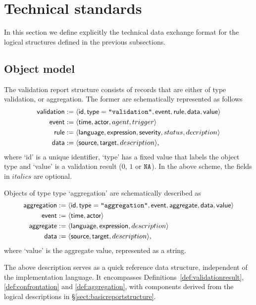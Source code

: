 \section{Technical standards}
\label{sect:standards}
In this section we define explicitly the technical data exchange format for the
logical structures defined in the previous subsections.

\subsection{Object model}
The validation report structure consists of records that are either of
type validation, or aggregation. The former are schematically represented as
follows
\begin{align*}
\textsf{validation}&:=\langle
  \textsf{id}
, \textsf{type}=\texttt{"validation"}
, \textsf{event}
, \textsf{rule}
,\textsf{data}
,\textsf{value}\rangle\\
\textsf{event} &:= \langle
  \textsf{time}
, \textsf{actor}
, agent
, trigger\rangle\\
\textsf{rule} &:=\langle
  \textsf{language}
, \textsf{expression}
, \textsf{severity}
, status
, decription\rangle\\
\textsf{data} &:=\langle
  \textsf{source}
, \textsf{target}
, description\rangle,
\end{align*}
where `id' is a unique identifier, `type' has a fixed value that labels the
object type and `value' is a validation result ($0$, $1$ or ${\normalfont \texttt{NA}}{}$). In the
above scheme, the fields in $italics$ are optional. 

Objects of type type `aggregation' are schematically described as
\begin{align*}
\textsf{aggregation} &:=\langle
  \textsf{id}
, \textsf{type}=\texttt{"aggregation"}
, \textsf{event}
, \textsf{aggregate}
, \textsf{data}
,\textsf{value}\rangle\\
\textsf{event} &:= \langle
  \textsf{time}
, \textsf{actor}\rangle\\
\textsf{aggregate} &:=\langle
  \textsf{language}
, \textsf{expression}
, description\rangle\\
\textsf{data} &:=\langle
  \textsf{source}
, \textsf{target}
, description\rangle,
\end{align*}
where `value' is the aggregate value, represented as a string.

The above description serves as a quick reference data structure, independent
of the implementation language. It encompasses
Definitions~\ref{def:validationresult}, \ref{def:confrontation} and
\ref{def:aggregation}, with components derived from the logical descriptions in
\S\ref{sect:basicreportstructure}.

